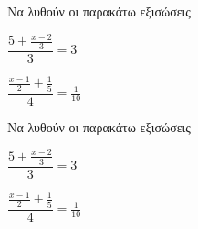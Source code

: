 Να λυθούν οι παρακάτω εξισώσεις
\begin{multicols}{2}
\begin{rlist}
\item $ \dfrac{5+\frac{x-2}{3}}{3}=3 $
\item $ \dfrac{\frac{x-1}{2}+\frac{1}{5}}{4}=\frac{1}{10} $
\end{rlist}
\end{multicols}
Να λυθούν οι παρακάτω εξισώσεις
\begin{multicols}{2}
\begin{rlist}
\item $ \dfrac{5+\frac{x-2}{3}}{3}=3 $
\item $ \dfrac{\frac{x-1}{2}+\frac{1}{5}}{4}=\frac{1}{10} $
\end{rlist}
\end{multicols}
